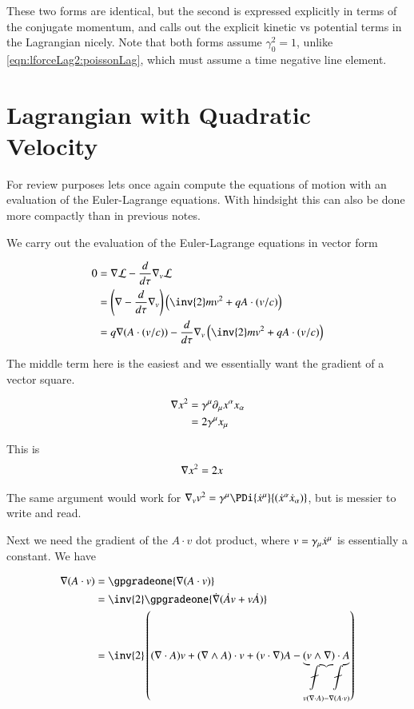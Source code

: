 These two forms are identical, but the second is expressed explicitly
in terms of the conjugate momentum, and calls out the explicit kinetic
vs potential terms in the Lagrangian nicely.  Note that both forms assume $\gamma_0^2 = 1$, unlike 
\ref{eqn:lforceLag2:poissonLag}, which must assume a time negative line element.

\section{Lagrangian with Quadratic Velocity}

For review purposes lets once again compute the equations of motion 
with an evaluation of the Euler-Lagrange equations.  With hindsight
this can also be done more compactly than in previous notes.

We carry out the evaluation of the Euler-Lagrange equations in vector form

\begin{align*}
0 
&= \grad \LL - \frac{d}{d\tau} \grad_v \LL \\
&= \left( \grad - \frac{d}{d\tau} \grad_v \right)
\left( \inv{2} m v^2 + q A \cdot (v/c) \right)
\\
&= q \grad (A \cdot (v/c))
- \frac{d}{d\tau} \grad_v 
\left( \inv{2} m v^2 + q A \cdot (v/c) \right)
\\
\end{align*}

The middle term here is the easiest and we essentially want the gradient of a vector square.

\begin{align*}
\nabla x^2
&=
\gamma^\mu \partial_\mu x^\alpha x_\alpha \\
&=
2 \gamma^\mu x_\mu \\
\end{align*}

This is
\begin{align}
\nabla x^2 &= 2 x
\end{align}

The same argument would work for $\grad_v v^2 = \gamma^\mu \PDi{\xdot^\mu}{(\xdot^\alpha \xdot_\alpha)}$, but is messier to write and read.

Next we need the gradient of the $A \cdot v$ dot product, where $v = \gamma_\mu \dot{x}^\mu$ is essentially a constant.
We have

\begin{align*}
\grad (A \cdot v)
&= \gpgradeone{ \grad (A \cdot v) } \\
&= \inv{2} \gpgradeone{ \dot{\grad} (\dot{A} v + v \dot{A}) } \\
&= \inv{2} \left( (\grad \cdot A) v + (\grad \wedge A) \cdot v + (v \cdot \grad) A - \underbrace{(v \wedge \grad) \cdot A}_{ v (\grad \cdot A) - \grad (A \cdot v)}
\right) \\
\end{align*}

